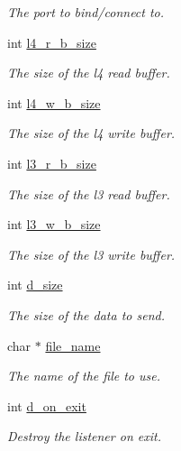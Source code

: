 \begin{DoxyCompactItemize}
\begin{DoxyCompactList}\small\item\em The port to bind/connect to. \end{DoxyCompactList}\item 
int \hyperlink{structtb__test__params__t_a8ae9ae9a85fbb77bc460b0d43e4fc1c5}{l4\-\_\-r\-\_\-b\-\_\-size}
\begin{DoxyCompactList}\small\item\em The size of the l4 read buffer. \end{DoxyCompactList}\item 
int \hyperlink{structtb__test__params__t_a97320ff488c6ed44b28b034c826482c7}{l4\-\_\-w\-\_\-b\-\_\-size}
\begin{DoxyCompactList}\small\item\em The size of the l4 write buffer. \end{DoxyCompactList}\item 
int \hyperlink{structtb__test__params__t_aa9d1ab0c9c6ef33a4b6bd60172dd0ec5}{l3\-\_\-r\-\_\-b\-\_\-size}
\begin{DoxyCompactList}\small\item\em The size of the l3 read buffer. \end{DoxyCompactList}\item 
int \hyperlink{structtb__test__params__t_aee0e87ac541b0694deb1499aa3371f91}{l3\-\_\-w\-\_\-b\-\_\-size}
\begin{DoxyCompactList}\small\item\em The size of the l3 write buffer. \end{DoxyCompactList}\item 
int \hyperlink{structtb__test__params__t_a848d9c2765e62bac90bee8355062858a}{d\-\_\-size}
\begin{DoxyCompactList}\small\item\em The size of the data to send. \end{DoxyCompactList}\item 
char $\ast$ \hyperlink{structtb__test__params__t_a8505c513bc640d1f69e5f76fb32b24a8}{file\-\_\-name}
\begin{DoxyCompactList}\small\item\em The name of the file to use. \end{DoxyCompactList}\item 
int \hyperlink{structtb__test__params__t_a093a636a4cc3aec4f564b9ab29081b59}{d\-\_\-on\-\_\-exit}
\begin{DoxyCompactList}\small\item\em Destroy the listener on exit. \end{DoxyCompactList}\item 

\end{DoxyCompactItemize}
